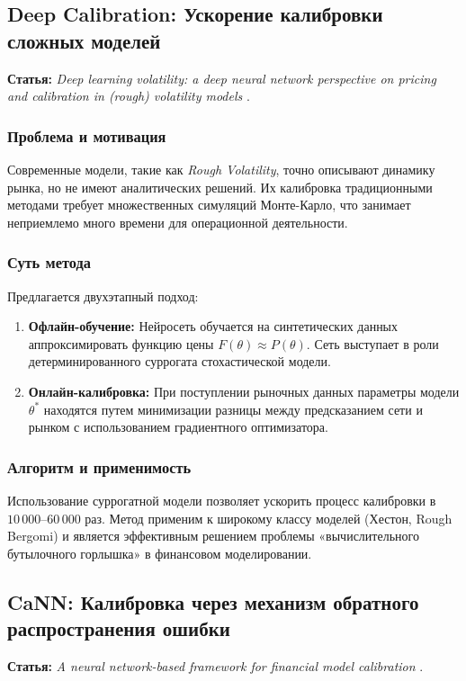 \subsection{Deep Calibration: Ускорение калибровки сложных моделей}
\textbf{Статья:} \textit{Deep learning volatility: a deep neural network perspective on pricing and calibration in (rough) volatility models} \cite{Horvath2019}.

\subsubsection{Проблема и мотивация}
Современные модели, такие как \textit{Rough Volatility}, точно описывают динамику рынка, но не имеют аналитических решений. Их калибровка традиционными методами требует множественных симуляций Монте-Карло, что занимает неприемлемо много времени для операционной деятельности.

\subsubsection{Суть метода}
Предлагается двухэтапный подход:
\begin{enumerate}
    \item \textbf{Офлайн-обучение:} Нейросеть обучается на синтетических данных аппроксимировать функцию цены $F(\theta) \approx P(\theta)$. Сеть выступает в роли детерминированного суррогата стохастической модели.
    \item \textbf{Онлайн-калибровка:} При поступлении рыночных данных параметры модели $\theta^*$ находятся путем минимизации разницы между предсказанием сети и рынком с использованием градиентного оптимизатора.
\end{enumerate}

\subsubsection{Алгоритм и применимость}
Использование суррогатной модели позволяет ускорить процесс калибровки в $10\,000$--$60\,000$ раз. Метод применим к широкому классу моделей (Хестон, Rough Bergomi) и является эффективным решением проблемы «вычислительного бутылочного горлышка» в финансовом моделировании.

\subsection{CaNN: Калибровка через механизм обратного распространения ошибки}
\textbf{Статья:} \textit{A neural network-based framework for financial model calibration} \cite{Liu2019}.

